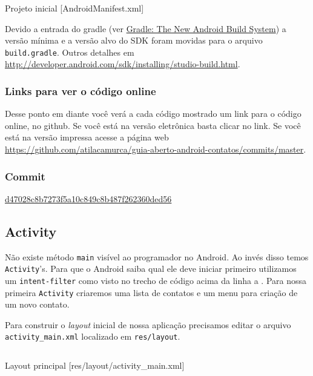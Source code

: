 \begin{listing}[H]
  \inputminted[linenos=true,frame=bottomline,tabsize=3]{ xml }{ source/AndroidManifest-1.xml }
  \caption{Projeto inicial [AndroidManifest.xml]}
  \label{code:android-manifest-1}
\end{listing}

Devido a entrada do \gls{gradle} (ver
\href{http://www.gradleware.com/android/gradle-the-new-android-build-system/}{Gradle:
The New Android Build System}) a versão mínima e a versão alvo do SDK
foram movidas para o arquivo \texttt{build.gradle}. Outros detalhes em
\url{http://developer.android.com/sdk/installing/studio-build.html}.

\subsubsection{Links para ver o código online}

Desse ponto em diante você verá a cada código mostrado um link para o
código online, no \gls{github}. Se você está na versão eletrônica basta
clicar no link. Se você está na versão impressa acesse a página web
\url{https://github.com/atilacamurca/guia-aberto-android-contatos/commits/master}.

\subsubsection{Commit}

\href{https://github.com/atilacamurca/guia-aberto-android-contatos/commit/d47028c8b7273f5a10c849c8b487f262360ded56}{d47028c8b7273f5a10c849c8b487f262360ded56}

\subsection{Activity \label{ssec:act}}

Não existe método \texttt{main} visível ao programador no Android. Ao
invés disso temos \texttt{Activity}'s. Para que o Android saiba qual ele
deve iniciar primeiro utilizamos um \texttt{intent-filter} como visto no
trecho de código acima da linha  a . Para nossa
primeira \texttt{Activity} criaremos uma lista de contatos e um menu
para criação de um novo contato.

Para construir o \emph{layout} inicial de nossa aplicação precisamos
editar o arquivo \texttt{activity\_main.xml} localizado em
\texttt{res/layout}.

\begin{listing}[H]
  \inputminted[linenos=true,frame=bottomline,tabsize=3]{ xml }{ source/main-1.xml }
  \caption{Layout principal [res/layout/activity_main.xml]}
\end{listing}

